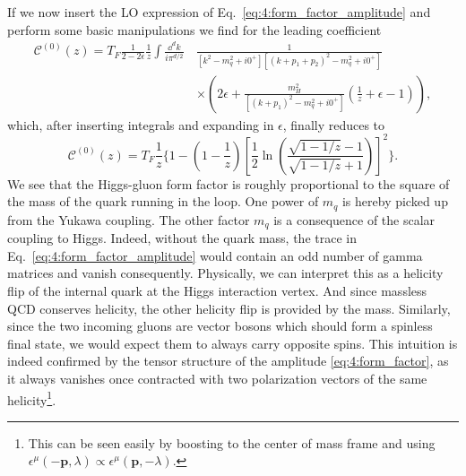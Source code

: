 If we now insert the \acs{LO} expression of Eq.~\eqref{eq:4:form_factor_amplitude} and perform some basic manipulations we find for the leading coefficient
\begin{equation}
\begin{split}
\mathcal{C}^{(0)} (z) = T_F \frac{1}{2 - 2 \epsilon} \frac{1}{z} \int \frac{\dd^d k}{i \pi^{d/2}} \,&\frac{1}{[k^2 - m_q^2 + i0^+][(k + p_1 + p_2)^2 - m_q^2 + i0^+]} \\
& \times \left( 2 \epsilon + \frac{m_H^2}{[(k + p_1)^2 - m_q^2 + i0^+]} \left(\frac{1}{z} + \epsilon - 1 \right) \right),
\label{eq:4:C0_integral_form}
\end{split}
\end{equation}
which, after inserting integrals and expanding in $\epsilon$, finally reduces to
\begin{equation}
\mathcal{C}^{(0)}(z) = T_F \frac{1}{z} \bigg \lbrace 1 - \left(1 - \frac{1}{z} \right) \left[ \frac{1}{2} \ln\! \left( \frac{\sqrt{1 - 1/z} - 1}{\sqrt{1 - 1/z} + 1} \right) \right]^2 \bigg \rbrace.
\label{eq:4:C0}
\end{equation}
We see that the Higgs-gluon form factor is roughly proportional to the square of the mass of the quark running in the loop. One power of $m_q$ is hereby picked up from the Yukawa coupling. The other factor $m_q$ is a consequence of the scalar coupling to Higgs. Indeed, without the quark mass, the trace in Eq.~\eqref{eq:4:form_factor_amplitude} would contain an odd number of gamma matrices and vanish consequently. Physically, we can interpret this as a helicity flip of the internal quark at the Higgs interaction vertex. And since massless \acs{QCD} conserves helicity, the other helicity flip is provided by the mass. Similarly, since the two incoming gluons are vector bosons which should form a spinless final state, we would expect them to always carry opposite spins. This intuition is indeed confirmed by the tensor structure of the amplitude \eqref{eq:4:form_factor}, as it always vanishes once contracted with two polarization vectors of the same helicity\footnote{This can be seen easily by boosting to the center of mass frame and using $\epsilon^\mu (-\mathbf{p}, \lambda) \propto \epsilon^\mu (\mathbf{p}, -\lambda)$.}.

